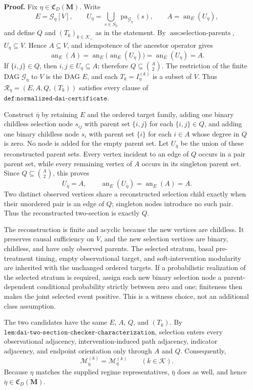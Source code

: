 \textbf{Proof.}
Fix \(\eta\in\mathfrak C_D(\mathbf M)\).  Write
\[
E=\mathcal G_\eta[V],\qquad
U_\eta=\bigcup_{s\in S_\eta}\operatorname{pa}_{\mathcal G_\eta}(s),\qquad
A=\operatorname{an}_E(U_\eta),
\]
and define \(Q\) and \((T_k)_{k\in\mathcal K_+}\) as in the statement.  By \(\operatorname{ass{:}selection\text{-}parents}\), \(U_\eta\subseteq V\).  Hence \(A\subseteq V\), and idempotence of the ancestor operator gives
\[
\operatorname{an}_E(A)
=\operatorname{an}_E\!\bigl(\operatorname{an}_E(U_\eta)\bigr)
=\operatorname{an}_E(U_\eta)
=A.
\]
If \(\{i,j\}\in Q\), then \(i,j\in U_\eta\subseteq A\); therefore \(Q\subseteq\binom A2\).  The restriction of the finite DAG \(\mathcal G_\eta\) to \(V\) is the DAG \(E\), and each \(T_k=I_\eta^{(k)}\) is a subset of \(V\).  Thus \(\mathcal R_\eta=(E,A,Q,(T_k))\) satisfies every clause of \(\texttt{def:normalized-dai-certificate}\).

Construct \(\bar\eta\) by retaining \(E\) and the ordered target family, adding one binary childless selection node \(s_{ij}\) with parent set \(\{i,j\}\) for each \(\{i,j\}\in Q\), and adding one binary childless node \(s_i\) with parent set \(\{i\}\) for each \(i\in A\) whose degree in \(Q\) is zero.  No node is added for the empty parent set.  Let \(U_{\bar\eta}\) be the union of these reconstructed parent sets.  Every vertex incident to an edge of \(Q\) occurs in a pair parent set, while every remaining vertex of \(A\) occurs in its singleton parent set.  Since \(Q\subseteq\binom A2\), this proves
\[
U_{\bar\eta}=A,
\qquad
\operatorname{an}_E(U_{\bar\eta})=\operatorname{an}_E(A)=A.
\]
Two distinct observed vertices share a reconstructed selection child exactly when their unordered pair is an edge of \(Q\); singleton nodes introduce no such pair.  Thus the reconstructed two-section is exactly \(Q\).

The reconstruction is finite and acyclic because the new vertices are childless.  It preserves causal sufficiency on \(V\), and the new selection vertices are binary, childless, and have only observed parents.  The selected stratum, basal pre-treatment timing, empty observational target, and soft-intervention modularity are inherited with the unchanged ordered targets.  If a probabilistic realization of the selected stratum is required, assign each new binary selection node a parent-dependent conditional probability strictly between zero and one; finiteness then makes the joint selected event positive.  This is a witness choice, not an additional class assumption.

The two candidates have the same \(E\), \(A\), \(Q\), and \((T_k)\).  By \(\texttt{lem:dai-two-section-checker-characterization}\), selection enters every observational adjacency, intervention-induced path adjacency, indicator adjacency, and endpoint orientation only through \(A\) and \(Q\).  Consequently,
\[
\mathcal M_{\bar\eta}^{(k)}=\mathcal M_\eta^{(k)}
\qquad(k\in\mathcal K).
\]
Because \(\eta\) matches the supplied regime representatives, \(\bar\eta\) does as well, and hence \(\bar\eta\in\mathfrak C_D(\mathbf M)\).

